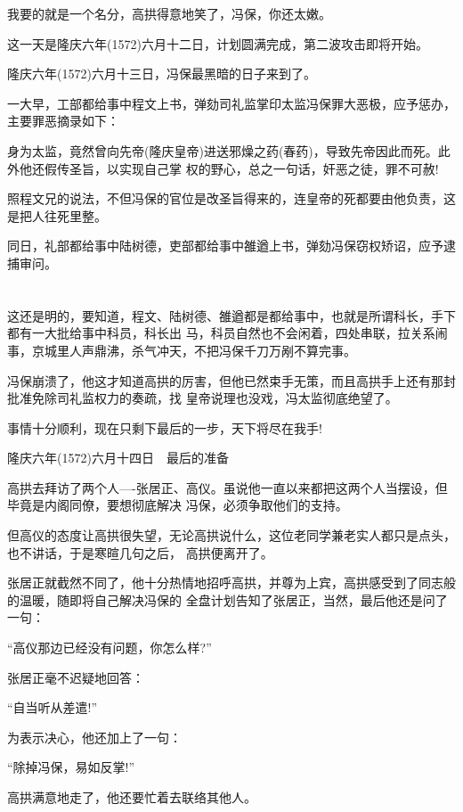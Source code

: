 \documentclass[11pt,a4paper,onecolumn]{article}
\begin{document}
我要的就是一个名分，高拱得意地笑了，冯保，你还太嫩。

这一天是隆庆六年(1572)六月十二日，计划圆满完成，第二波攻击即将开始。

隆庆六年(1572)六月十三日，冯保最黑暗的日子来到了。

一大早，工部都给事中程文上书，弹劾司礼监掌印太监冯保罪大恶极，应予惩办，主要罪恶摘录如下：

身为太监，竟然曾向先帝(隆庆皇帝)进送邪燥之药(春药)，导致先帝因此而死。此外他还假传圣旨，以实现自己掌
权的野心，总之一句话，奸恶之徒，罪不可赦!

照程文兄的说法，不但冯保的官位是改圣旨得来的，连皇帝的死都要由他负责，这是把人往死里整。

同日，礼部都给事中陆树德，吏部都给事中雒遒上书，弹劾冯保窃权矫诏，应予逮捕审问。

\section[\thesection]{}

这还是明的，要知道，程文、陆树德、雒遒都是都给事中，也就是所谓科长，手下都有一大批给事中科员，科长出
马，科员自然也不会闲着，四处串联，拉关系闹事，京城里人声鼎沸，杀气冲天，不把冯保千刀万剐不算完事。

冯保崩溃了，他这才知道高拱的厉害，但他已然束手无策，而且高拱手上还有那封批准免除司礼监权力的奏疏，找
皇帝说理也没戏，冯太监彻底绝望了。

事情十分顺利，现在只剩下最后的一步，天下将尽在我手!

隆庆六年(1572)六月十四日　最后的准备

高拱去拜访了两个人----张居正、高仪。虽说他一直以来都把这两个人当摆设，但毕竟是内阁同僚，要想彻底解决
冯保，必须争取他们的支持。

但高仪的态度让高拱很失望，无论高拱说什么，这位老同学兼老实人都只是点头，也不讲话，于是寒暄几句之后，
高拱便离开了。

张居正就截然不同了，他十分热情地招呼高拱，并尊为上宾，高拱感受到了同志般的温暖，随即将自己解决冯保的
全盘计划告知了张居正，当然，最后他还是问了一句：

``高仪那边已经没有问题，你怎么样?''

张居正毫不迟疑地回答：

``自当听从差遣!''

为表示决心，他还加上了一句：

``除掉冯保，易如反掌!''

高拱满意地走了，他还要忙着去联络其他人。
\end{document}
